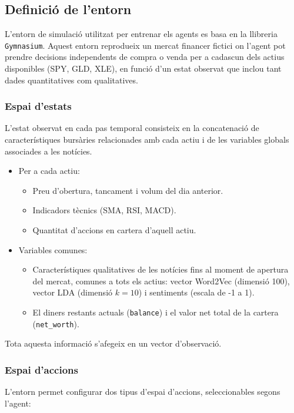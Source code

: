 \documentclass[12pt,a4paper,twoside]{book}
\begin{document}
\subsection{Definició de l'entorn}
L'entorn de simulació utilitzat per entrenar els agents es basa en la llibreria \texttt{Gymnasium}. Aquest entorn reprodueix un mercat financer fictici on l'agent pot prendre decisions independents de compra o venda per a cadascun dels actius disponibles (SPY, GLD, XLE), en funció d'un estat observat que inclou tant dades quantitatives com qualitatives.

\subsubsection{Espai d'estats}
L'estat observat en cada pas temporal consisteix en la concatenació de característiques bursàries relacionades amb cada actiu i de les variables globals associades a les notícies.
\begin{itemize}
    \item Per a cada actiu:
    \begin{itemize}
        \item Preu d'obertura, tancament i volum del dia anterior.
        \item Indicadors tècnics (SMA, RSI, MACD).
        \item Quantitat d'accions en cartera d'aquell actiu.
    \end{itemize}
    \item Variables comunes:
    \begin{itemize}
        \item Característiques qualitatives de les notícies fins al moment de apertura del mercat, comunes a tots els actius: vector Word2Vec (dimensió 100), vector LDA (dimensió $k=10$) i sentiments (escala de -1 a 1).
        \item El diners restants actuals (\texttt{balance}) i el valor net total de la cartera (\texttt{net\_worth}).
    \end{itemize}
\end{itemize}

Tota aquesta informació s'afegeix en un vector d'observació.

\subsubsection{Espai d'accions}
L'entorn permet configurar dos tipus d'espai d'accions, seleccionables segons l'agent:
\vspace{0.5em}
\end{document}
